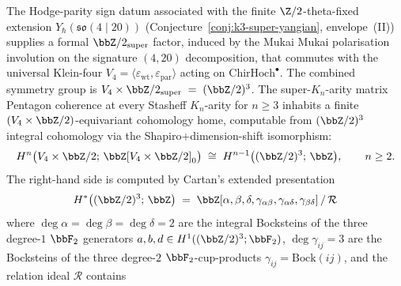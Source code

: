 
\begin{theorem}
\label{thm:super-Kn-tower-stratification}
The Hodge-parity sign datum associated with the finite $\Z/2$-theta-fixed extension
$Y_\hbar(\mathfrak{so}(4 \mid 20))$
\textup{(}Conjecture~\ref{conj:k3-super-yangian}, envelope~(II)\textup{)}
supplies a formal $\bbZ/2_{\mathrm{super}}$ factor, induced by the Mukai
Mukai polarisation involution on the signature $(4, 20)$ decomposition, that
commutes with the universal Klein-four
$V_4 = \langle \varepsilon_{\mathrm{wt}},
\varepsilon_{\mathrm{par}} \rangle$ acting on
$\mathrm{ChirHoch}^\bullet$. The combined symmetry group is
$V_4 \times \bbZ/2_{\mathrm{super}} \;=\; (\bbZ/2)^3$. The
super-$K_n$-arity matrix Pentagon coherence at every Stasheff $K_n$-arity
for $n \geq 3$ inhabits a finite $(V_4 \times \bbZ/2)$-equivariant
cohomology home, computable from $(\bbZ/2)^3$ integral cohomology via
the Shapiro+dimension-shift isomorphism:
\[
 H^n\bigl(V_4 \times \bbZ/2;\, \bbZ[V_4 \times \bbZ/2]_0\bigr)
 \;\cong\; H^{n-1}\bigl((\bbZ/2)^3;\, \bbZ\bigr),
 \qquad n \geq 2.
\]
The right-hand side is computed by Cartan's extended presentation
\[
 H^*\bigl((\bbZ/2)^3;\, \bbZ\bigr)
 \;=\; \bbZ[\alpha, \beta, \delta,
 \gamma_{\alpha\beta}, \gamma_{\alpha\delta}, \gamma_{\beta\delta}]
 \,/\, \mathcal{R}
\]
where $\deg \alpha = \deg \beta = \deg \delta = 2$ are the integral
Bocksteins of the three degree-$1$ $\bbF_2$ generators
$a, b, d \in H^1((\bbZ/2)^3; \bbF_2)$,
$\deg \gamma_{ij} = 3$ are the Bocksteins of the three degree-$2$
$\bbF_2$-cup-products
$\gamma_{ij} = \mathrm{Bock}(ij)$, and the relation ideal $\mathcal{R}$
contains
\begin{enumerate}[label=\textup{(R\arabic*)}]
\item $2 \alpha = 2 \beta = 2 \delta = 2 \gamma_{\alpha\beta}

\end{enumerate}
\end{theorem}
